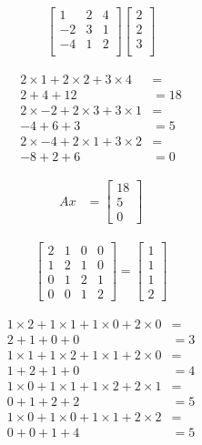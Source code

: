 \documentclass[paper=a4, fontsize=10pt]{scrartcl} %
\begin{document}
	\setcounter{equation}{0}
	\begin{align*}
		\begin{bmatrix}
			  1 & 2 & 4 \\
			 -2 & 3 & 1 \\
			 -4 & 1 & 2 \\
		\end{bmatrix}
		\begin{bmatrix}
		2 \\
		2 \\
		3 \\
		\end{bmatrix}
	\end{align*}

	\begin{align*}
	2 \times  1 + 2 \times 2 + 3 \times 4  &= \\  2 + 4 + 12  &=  18 \\
	2 \times -2 + 2 \times 3 + 3 \times 1  &= \\ -4 + 6 + 3   &=  5 \\
	2 \times -4 + 2 \times 1 + 3 \times 2  &= \\ -8 + 2 + 6   &=  0
	\end{align*}

	\begin{align}
		Ax &=
		\begin{bmatrix}
		    18 \\
			 5 \\
	   		 0
	   	\end{bmatrix}
	\end{align}

	\begin{align*}
		\begin{bmatrix}
			2 & 1 & 0 & 0 \\
			1 & 2 & 1 & 0 \\
			0 & 1 & 2 & 1 \\
			0 & 0 & 1 & 2
		\end{bmatrix}
		=
		\begin{bmatrix}
			1 \\
			1 \\
			1 \\
			2
		\end{bmatrix}
	\end{align*}

	\begin{align*}
		1 \times 2 + 1 \times 1 + 1 \times 0 + 2 \times 0  &= \\  2 + 1 + 0 + 0  &=  3 \\
		1 \times 1 + 1 \times 2 + 1 \times 1 + 2 \times 0  &= \\  1 + 2 + 1 + 0  &=  4 \\
		1 \times 0 + 1 \times 1 + 1 \times 2 + 2 \times 1  &= \\  0 + 1 + 2 + 2  &=  5 \\
		1 \times 0 + 1 \times 0 + 1 \times 1 + 2 \times 2  &= \\  0 + 0 + 1 + 4  &=  5
	\end{align*}
\end{document}
